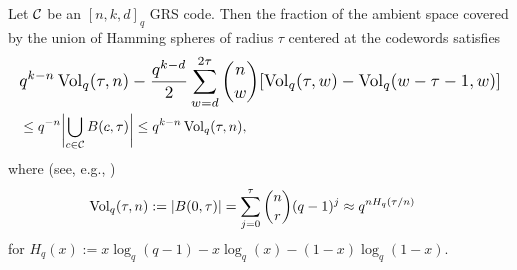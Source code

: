 \documentclass[conference]{IEEEtran}
\begin{document}
\begin{corollary}
    \label{cor:union-lower-bound} 
    Let ${\mathcal C}$ be an $[n, k, d]_{q}$ GRS code. Then
    the fraction of the ambient space covered by the union of Hamming spheres of radius $\tau$ centered at the codewords satisfies 
    \begin{align*}
        & \resizebox{\hsize}{!}{$\displaystyle q^{k - n} 
        \Vol_{q}(\tau, n) 
        - \frac{q^{k - d}}{2}  
        \sum_{w = d}^{2 \tau} 
        \binom{n}{w} 
        [\Vol_{q}(\tau, w) - \Vol_{q}(w - \tau - 1, w)]$} 
        \\ 
        &\le %
        q^{-n} \bigabs{\bigcup_{c \in \CC} B(c, \tau)} 
        \le q^{k - n} 
        \Vol_{q}(\tau, n),  
    \end{align*}
    where (see, e.g., \cite{ecc})
    \begin{align*}
        \operatorname{Vol}_{q}(\tau, n) 
        &:= |B(0, \tau)| 
        = \sum_{j = 0}^{\tau} 
        \binom{n}{r} (q - 1)^{j} 
        \approx q^{n H_{q}(\tau / n)}
    \end{align*}
    for $H_{q}(x) := x \log_{q}(q - 1) - x \log_{q}(x) - (1 - x) \log_{q}(1 - x)$. 
\end{corollary}
\end{document}
